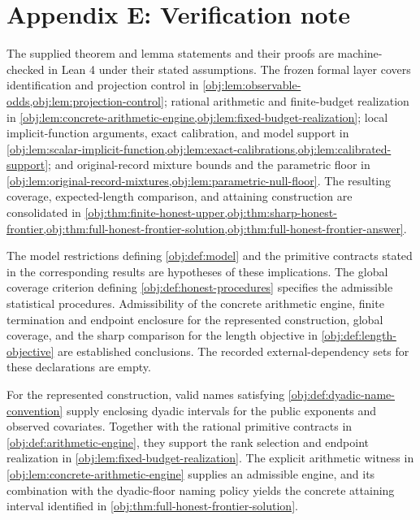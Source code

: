 \section{Appendix E: Verification note}

The supplied theorem and lemma statements and their proofs are machine-checked in Lean 4 under their stated assumptions. The frozen formal layer covers identification and projection control in \cref{obj:lem:observable-odds,obj:lem:projection-control}; rational arithmetic and finite-budget realization in \cref{obj:lem:concrete-arithmetic-engine,obj:lem:fixed-budget-realization}; local implicit-function arguments, exact calibration, and model support in \cref{obj:lem:scalar-implicit-function,obj:lem:exact-calibrations,obj:lem:calibrated-support}; and original-record mixture bounds and the parametric floor in \cref{obj:lem:original-record-mixtures,obj:lem:parametric-null-floor}. The resulting coverage, expected-length comparison, and attaining construction are consolidated in \cref{obj:thm:finite-honest-upper,obj:thm:sharp-honest-frontier,obj:thm:full-honest-frontier-solution,obj:thm:full-honest-frontier-answer}.

The model restrictions defining \cref{obj:def:model} and the primitive contracts stated in the corresponding results are hypotheses of these implications. The global coverage criterion defining \cref{obj:def:honest-procedures} specifies the admissible statistical procedures. Admissibility of the concrete arithmetic engine, finite termination and endpoint enclosure for the represented construction, global coverage, and the sharp comparison for the length objective in \cref{obj:def:length-objective} are established conclusions. The recorded external-dependency sets for these declarations are empty.

For the represented construction, valid names satisfying \cref{obj:def:dyadic-name-convention} supply enclosing dyadic intervals for the public exponents and observed covariates. Together with the rational primitive contracts in \cref{obj:def:arithmetic-engine}, they support the rank selection and endpoint realization in \cref{obj:lem:fixed-budget-realization}. The explicit arithmetic witness in \cref{obj:lem:concrete-arithmetic-engine} supplies an admissible engine, and its combination with the dyadic-floor naming policy yields the concrete attaining interval identified in \cref{obj:thm:full-honest-frontier-solution}.

